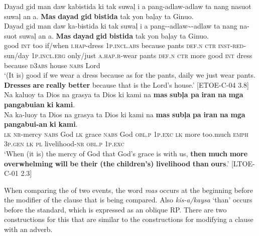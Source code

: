 \newpage
\ea
Dayad  gid  man  daw  kabistida  ki  tak  suwaļ  i  a pang-adlaw-adlaw  ta  nang  nasuot  suwaļ  an  a. \textbf{Mas}  \textbf{dayad}  \textbf{gid}  \textbf{bistida}  tak  yon  baļay  ta  Ginuo. \\\smallskip \gll Dayad  gid  man  daw  ka-bistida  ki  tak  suwaļ  i  a pang-{}-adlaw\sim{}-adlaw  ta  nang  na-suot  suwaļ  an  a. \textbf{Mas}  \textbf{dayad}  \textbf{gid}  \textbf{bistida}  tak  yon  baļay  ta  Ginuo. \\
good  \textsc{int}  too  if/when  \textsc{i.hap}-dress  1\textsc{p.incl.abs}  because  pants  \textsc{def.n}  \textsc{ctr}
\textsc{inst}-\textsc{red}-sun/day  1\textsc{p.incl.erg}  only/just  \textsc{a.hap.r}-wear  pants  \textsc{def.n}  \textsc{ctr}
more  good  \textsc{int}  dress  because  \textsc{d}3\textsc{abs}  house  \textsc{nabs}  Lord \\
\glt ‘(It is) good if we wear a dress because as for the pants, daily we just wear pants. \textbf{Dresses} \textbf{are} \textbf{really} \textbf{better} because that is the Lord’s house.’ [ETOE-C-04 3.8]
\z
\ea
Na  kaluoy  ta  Dios  na  grasya  ta  Dios  ki  kami  na  \textbf{mas} \textbf{subļa  pa}  \textbf{iran}  \textbf{na}  \textbf{mga}  \textbf{pangabuian}  \textbf{ki}  \textbf{kami}. \\\smallskip \gll Na  ka-luoy  ta  Dios  na  grasya  ta  Dios  ki  kami  na  \textbf{mas} \textbf{subļa}  \textbf{pa}  \textbf{iran}  \textbf{na}  \textbf{mga}  \textbf{pangabui-an}  \textbf{ki}  \textbf{kami}. \\
\textsc{lk}  \textsc{nr}-mercy  \textsc{nabs}  God  \textsc{lk}  grace  \textsc{nabs}  God  \textsc{obl.p}  1\textsc{p.exc}  \textsc{lk}  more too.much  \textsc{emph}  3\textsc{p.gen}  \textsc{lk}  \textsc{pl}  livelihood-\textsc{nr}  \textsc{obl.p}  1\textsc{p.exc} \\
\glt ‘When (it is) the mercy of God that God’s grace is with us, \textbf{then} \textbf{much} \textbf{more} \textbf{overwhelming} \textbf{will} \textbf{be} \textbf{their} \textbf{(the} \textbf{children’s)} \textbf{livelihood} \textbf{than} \textbf{ours}.’ [LTOE-C-01 2.3]
\z

When comparing the  of two events, the word \textit{mas} occurs at the beginning before the modifier of the clause that is being compared. Also \textit{kis-a/kaysa} ‘than’ occurs before the standard, which is expressed as an oblique RP. There are two constructions for this that are similar to the constructions for modifying a clause with an adverb.

